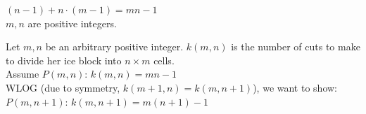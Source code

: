 \documentclass[12pt]{exam}
\begin{document}
\begin{solution} 
    \begin{qparts}
        \item $(n-1) + n\cdot (m-1) = mn - 1$\\
             $m,n$ are positive integers.
        \item 
        Let $m,n$ be an arbitrary positive integer. $k(m,n)$ is 
        the number of cuts to make to divide her ice block into $n \times m$ cells.\\
        Assume $P(m,n)$: $k(m,n) = mn - 1$\\
        WLOG (due to symmetry, $k(m+1, n ) = k(m,n+1)$), 
        we want to show: $P(m, n+ 1)$: $k(m,n + 1) = m(n+1) - 1$\\\\


\end{qparts}
\end{solution}
\end{document}
